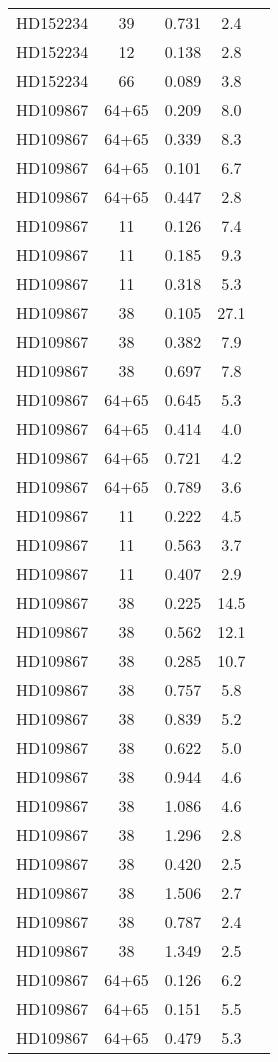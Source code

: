 \begin{table*}
\begin{tabular}{l c c c c}
HD152234 & 39 & 0.731 & 2.4\\ 
HD152234 & 12 & 0.138 & 2.8\\ 
HD152234 & 66 & 0.089 & 3.8\\ 
\hline
HD109867 & 64+65 & 0.209 & 8.0\\ 
HD109867 & 64+65 & 0.339 & 8.3\\ 
HD109867 & 64+65 & 0.101 & 6.7\\ 
HD109867 & 64+65 & 0.447 & 2.8\\ 
HD109867 & 11 & 0.126 & 7.4\\ 
HD109867 & 11 & 0.185 & 9.3\\ 
HD109867 & 11 & 0.318 & 5.3\\ 
HD109867 & 38 & 0.105 & 27.1\\ 
HD109867 & 38 & 0.382 & 7.9\\ 
HD109867 & 38 & 0.697 & 7.8\\ 
HD109867 & 64+65 & 0.645 & 5.3\\ 
HD109867 & 64+65 & 0.414 & 4.0\\ 
HD109867 & 64+65 & 0.721 & 4.2\\ 
HD109867 & 64+65 & 0.789 & 3.6\\ 
HD109867 & 11 & 0.222 & 4.5\\ 
HD109867 & 11 & 0.563 & 3.7\\ 
HD109867 & 11 & 0.407 & 2.9\\ 
HD109867 & 38 & 0.225 & 14.5\\ 
HD109867 & 38 & 0.562 & 12.1\\ 
HD109867 & 38 & 0.285 & 10.7\\ 
HD109867 & 38 & 0.757 & 5.8\\ 
HD109867 & 38 & 0.839 & 5.2\\ 
HD109867 & 38 & 0.622 & 5.0\\ 
HD109867 & 38 & 0.944 & 4.6\\ 
HD109867 & 38 & 1.086 & 4.6\\ 
HD109867 & 38 & 1.296 & 2.8\\ 
HD109867 & 38 & 0.420 & 2.5\\ 
HD109867 & 38 & 1.506 & 2.7\\ 
HD109867 & 38 & 0.787 & 2.4\\ 
HD109867 & 38 & 1.349 & 2.5\\ 
HD109867 & 64+65 & 0.126 & 6.2\\ 
HD109867 & 64+65 & 0.151 & 5.5\\ 
HD109867 & 64+65 & 0.479 & 5.3\\ 

\end{tabular}
\end{table*}
